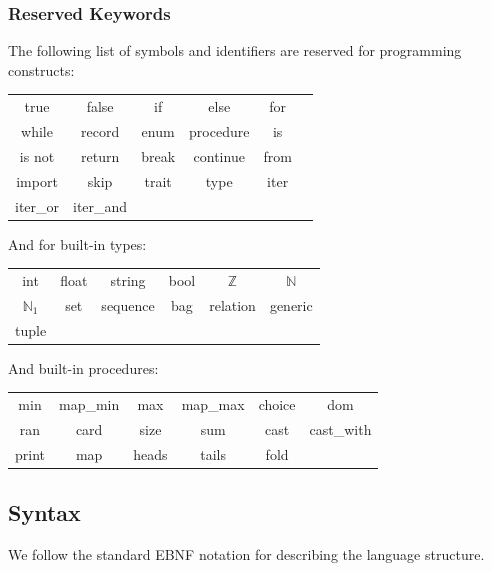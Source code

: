 \documentclass{article}
\begin{document}
\subsubsection{Reserved Keywords}
The following list of symbols and identifiers are reserved for programming constructs:

\begin{center}
\begin{tabular}{c c c c c c}
true & false & if & else & for\\
while & record & enum & procedure & is\\
is not & return & break & continue & from\\
import & skip & trait & type & iter \\
iter\_or & iter\_and
\end{tabular}
\end{center}

And for built-in types:
\begin{center}
\begin{tabular}{c c c c c c}
int &
float &
string &
bool &
$\mathbb{Z}$ &
$\mathbb{N}$ \\
$\mathbb{N}_1$ &
set &
sequence &
bag &
relation &
generic \\
tuple &
\end{tabular}
\end{center}

And built-in procedures:

\begin{center}
\begin{tabular}{c c c c c c}
min &
map\_min &
max &
map\_max &
choice &
dom \\
ran &
card &
size &
sum &
cast &
cast\_with \\
print &
map &
heads &
tails &
fold
\end{tabular}
\end{center}

\subsection{Syntax}
We follow the standard EBNF notation for describing the language structure.
\end{document}
